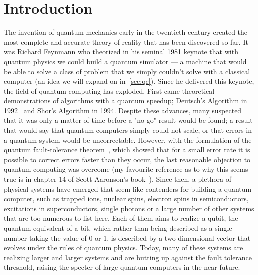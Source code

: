 \chapter{Introduction}

The invention of quantum mechanics early in the twentieth century created the most complete and accurate
theory of reality that has been discovered so far. It was Richard Feynmann who theorized in his 
seminal 1981 keynote\cite{Feynman1982} that with quantum physics we could build a quantum simulator --- 
a machine that would be able to solve a class of problem that we simply couldn't solve with a
classical computer (an idea we will expand on in~\ref{sec:qc}). Since he delivered this keynote, the
field of quantum computing has exploded. First came theoretical demonstrations of algorithms
with a quantum speedup; Deutsch's Algorithm in 1992~\cite{Deutsch} and Shor's Algorithm in 1994. 
Despite these advances, many suspected that it was only a matter of time before a "no-go" result would
be found; a result that would say that quantum computers simply could not scale, or that errors in a 
quantum system would be uncorrectable.
However, with the formulation of the quantum fault-tolerance theorem~\cite{1996quant.ph.11025A}, which
showed that for a small error rate it is possible to correct errors faster than they occur, the last
reasonable objection to quantum computing was overcome (my favourite reference as to why this seems true
is in chapter 14 of Scott Aaronson's book~\cite{Aaronson:skepticism}). Since then, a plethora of physical
systems have emerged that seem like contenders for building a quantum computer, such as trapped 
ions, nuclear spins, electron spins in semiconductors, excitations in superconductors, single photons
or a large number of other systems that are too numerous to list here. Each of them aims to realize a qubit,
the quantum equivalent of a bit, which rather than being described as a single number taking the value of
0 or 1, is described by a two-dimensional vector that evolves under the rules of quantum physics. Today,
many of these systems are realizing larger and larger systems and are butting up against the fault tolerance 
threshold, raising the specter of large quantum computers in the near future. 


